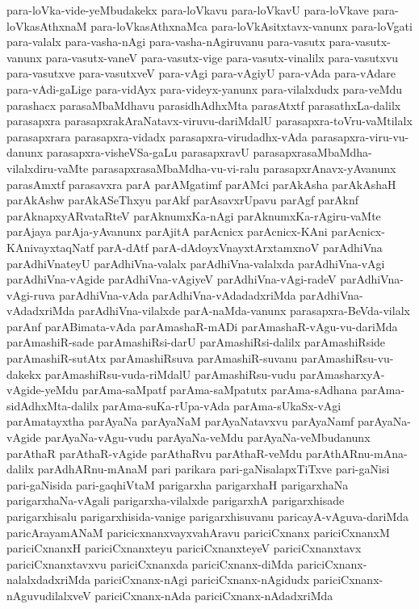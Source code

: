 {para-loVka-vide-yeMbudakekx
para-loVkavu
para-loVkavU
para-loVkave
para-loVkasAthxnaM
para-loVkasAthxnaMca
para-loVkAsitxtavx-vanunx
para-loVgati
para-valalx
para-vasha-nAgi
para-vasha-nAgiruvanu
para-vasutx
para-vasutx-vanunx
para-vasutx-vaneV
para-vasutx-vige
para-vasutx-vinalilx
para-vasutxvu
para-vasutxve
para-vasutxveV
para-vAgi
para-vAgiyU
para-vAda
para-vAdare
para-vAdi-gaLige
para-vidAyx
para-videyx-yanunx
para-vilalxdudx
para-veMdu
parashacx
parasaMbaMdhavu
parasidhAdhxMta
parasAtxtf
parasathxLa-dalilx
parasapxra
parasapxrakAraNatavx-viruvu-dariMdalU
parasapxra-toVru-vaMtilalx
parasapxrara
parasapxra-vidadx
parasapxra-virudadhx-vAda
parasapxra-viru-vu-danunx
parasapxra-visheVSa-gaLu
parasapxravU
parasapxrasaMbaMdha-vilalxdiru-vaMte
parasapxrasaMbaMdha-vu-vi-ralu
parasapxrAnavx-yAvanunx
parasAmxtf
parasavxra
parA
parAMgatimf
parAMci
parAkAsha
parAkAshaH
parAkAshw
parAkASeThxyu
parAkf
parAsavxrUpavu
parAgf
parAknf
parAknapxyARvataRteV
parAknumxKa-nAgi
parAknumxKa-rAgiru-vaMte
parAjaya
parAja-yAvanunx
parAjitA
parAcnicx
parAcnicx-KAni
parAcnicx-KAnivayxtaqNatf
parA-dAtf
parA-dAdoyxVnayxtArxtamxnoV
parAdhiVna
parAdhiVnateyU
parAdhiVna-valalx
parAdhiVna-valalxda
parAdhiVna-vAgi
parAdhiVna-vAgide
parAdhiVna-vAgiyeV
parAdhiVna-vAgi-radeV
parAdhiVna-vAgi-ruva
parAdhiVna-vAda
parAdhiVna-vAdadadxriMda
parAdhiVna-vAdadxriMda
parAdhiVna-vilalxde
parA-naMda-vanunx
parasapxra-BeVda-vilalx
parAnf
parABimata-vAda
parAmashaR-mADi
parAmashaR-vAgu-vu-dariMda
parAmashiR-sade
parAmashiRsi-darU
parAmashiRsi-dalilx
parAmashiRside
parAmashiR-sutAtx
parAmashiRsuva
parAmashiR-suvanu
parAmashiRsu-vu-dakekx
parAmashiRsu-vuda-riMdalU
parAmashiRsu-vudu
parAmasharxyA-vAgide-yeMdu
parAma-saMpatf
parAma-saMpatutx
parAma-sAdhana
parAma-sidAdhxMta-dalilx
parAma-suKa-rUpa-vAda
parAma-sUkaSx-vAgi
parAmatayxtha
parAyaNa
parAyaNaM
parAyaNatavxvu
parAyaNamf
parAyaNa-vAgide
parAyaNa-vAgu-vudu
parAyaNa-veMdu
parAyaNa-veMbudanunx
parAthaR
parAthaR-vAgide
parAthaRvu
parAthaR-veMdu
parAthARnu-mAna-dalilx
parAdhARnu-mAnaM
pari
parikara
pari-gaNisalapxTiTxve
pari-gaNisi
pari-gaNisida
pari-gaqhiVtaM
parigarxha
parigarxhaH
parigarxhaNa
parigarxhaNa-vAgali
parigarxha-vilalxde
parigarxhA
parigarxhisade
parigarxhisalu
parigarxhisida-vanige
parigarxhisuvanu
paricayA-vAguva-dariMda
paricArayamANaM
paricicxnanxvayxvahAravu
pariciCxnanx
pariciCxnanxM
pariciCxnanxH
pariciCxnanxteyu
pariciCxnanxteyeV
pariciCxnanxtavx
pariciCxnanxtavxvu
pariciCxnanxda
pariciCxnanx-diMda
pariciCxnanx-nalalxdadxriMda
pariciCxnanx-nAgi
pariciCxnanx-nAgidudx
pariciCxnanx-nAguvudilalxveV
pariciCxnanx-nAda
pariciCxnanx-nAdadxriMda
}
